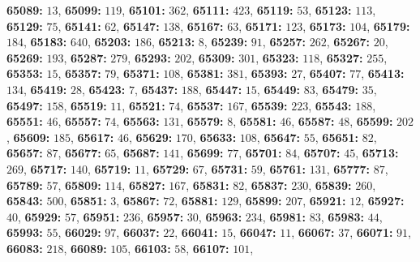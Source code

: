 \textsf{\bfseries 65089:} $13$, \textsf{\bfseries 65099:} $119$, \textsf{\bfseries 65101:} $362$, \textsf{\bfseries 65111:} $423$, \textsf{\bfseries 65119:} $53$, \textsf{\bfseries 65123:} $113$, \textsf{\bfseries 65129:} $75$, \textsf{\bfseries 65141:} $62$, \textsf{\bfseries 65147:} $138$, \textsf{\bfseries 65167:} $63$, \textsf{\bfseries 65171:} $123$, \textsf{\bfseries 65173:} $104$, \textsf{\bfseries 65179:} $184$, \textsf{\bfseries 65183:} $640$, \textsf{\bfseries 65203:} $186$, \textsf{\bfseries 65213:} $8$, \textsf{\bfseries 65239:} $91$, \textsf{\bfseries 65257:} $262$, \textsf{\bfseries 65267:} $20$, \textsf{\bfseries 65269:} $193$, \textsf{\bfseries 65287:} $279$, \textsf{\bfseries 65293:} $202$, \textsf{\bfseries 65309:} $301$, \textsf{\bfseries 65323:} $118$, \textsf{\bfseries 65327:} $255$, \textsf{\bfseries 65353:} $15$, \textsf{\bfseries 65357:} $79$, \textsf{\bfseries 65371:} $108$, \textsf{\bfseries 65381:} $381$, \textsf{\bfseries 65393:} $27$, \textsf{\bfseries 65407:} $77$, \textsf{\bfseries 65413:} $134$, \textsf{\bfseries 65419:} $28$, \textsf{\bfseries 65423:} $7$, \textsf{\bfseries 65437:} $188$, \textsf{\bfseries 65447:} $15$, \textsf{\bfseries 65449:} $83$, \textsf{\bfseries 65479:} $35$, \textsf{\bfseries 65497:} $158$, \textsf{\bfseries 65519:} $11$, \textsf{\bfseries 65521:} $74$, \textsf{\bfseries 65537:} $167$, \textsf{\bfseries 65539:} $223$, \textsf{\bfseries 65543:} $188$, \textsf{\bfseries 65551:} $46$, \textsf{\bfseries 65557:} $74$, \textsf{\bfseries 65563:} $131$, \textsf{\bfseries 65579:} $8$, \textsf{\bfseries 65581:} $46$, \textsf{\bfseries 65587:} $48$, \textsf{\bfseries 65599:} $202$, \textsf{\bfseries 65609:} $185$, \textsf{\bfseries 65617:} $46$, \textsf{\bfseries 65629:} $170$, \textsf{\bfseries 65633:} $108$, \textsf{\bfseries 65647:} $55$, \textsf{\bfseries 65651:} $82$, \textsf{\bfseries 65657:} $87$, \textsf{\bfseries 65677:} $65$, \textsf{\bfseries 65687:} $141$, \textsf{\bfseries 65699:} $77$, \textsf{\bfseries 65701:} $84$, \textsf{\bfseries 65707:} $45$, \textsf{\bfseries 65713:} $269$, \textsf{\bfseries 65717:} $140$, \textsf{\bfseries 65719:} $11$, \textsf{\bfseries 65729:} $67$, \textsf{\bfseries 65731:} $59$, \textsf{\bfseries 65761:} $131$, \textsf{\bfseries 65777:} $87$, \textsf{\bfseries 65789:} $57$, \textsf{\bfseries 65809:} $114$, \textsf{\bfseries 65827:} $167$, \textsf{\bfseries 65831:} $82$, \textsf{\bfseries 65837:} $230$, \textsf{\bfseries 65839:} $260$, \textsf{\bfseries 65843:} $500$, \textsf{\bfseries 65851:} $3$, \textsf{\bfseries 65867:} $72$, \textsf{\bfseries 65881:} $129$, \textsf{\bfseries 65899:} $207$, \textsf{\bfseries 65921:} $12$, \textsf{\bfseries 65927:} $40$, \textsf{\bfseries 65929:} $57$, \textsf{\bfseries 65951:} $236$, \textsf{\bfseries 65957:} $30$, \textsf{\bfseries 65963:} $234$, \textsf{\bfseries 65981:} $83$, \textsf{\bfseries 65983:} $44$, \textsf{\bfseries 65993:} $55$, \textsf{\bfseries 66029:} $97$, \textsf{\bfseries 66037:} $22$, \textsf{\bfseries 66041:} $15$, \textsf{\bfseries 66047:} $11$, \textsf{\bfseries 66067:} $37$, \textsf{\bfseries 66071:} $91$, \textsf{\bfseries 66083:} $218$, \textsf{\bfseries 66089:} $105$, \textsf{\bfseries 66103:} $58$, \textsf{\bfseries 66107:} $101$, 
